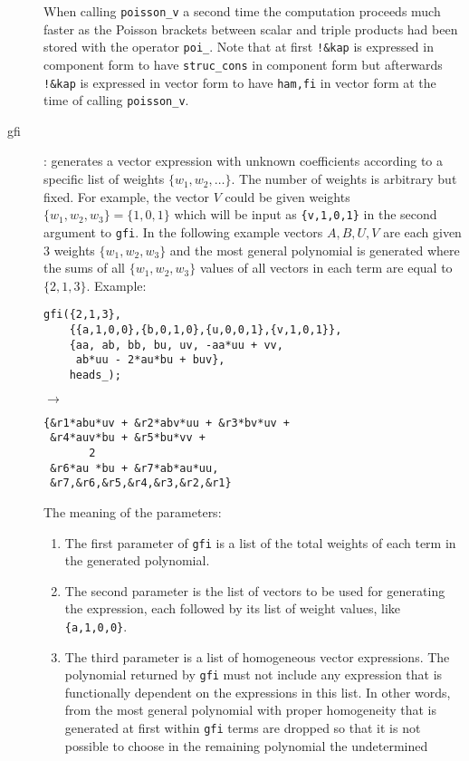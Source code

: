 \begin{description}
  When calling \texttt{poisson\_v} a second time the computation
  proceeds much faster as the Poisson brackets between scalar and
  triple products had been stored with the operator \texttt{poi\_}.
  Note that at first \texttt{!\&kap} is expressed in component form to
  have \texttt{struc\_cons} in component form but afterwards
  \texttt{!\&kap} is expressed in vector form to have \texttt{ham,fi}
  in vector form at the time of calling \texttt{poisson\_v}.

\item[gfi] : generates a vector expression with unknown coefficients
  according to a specific list of weights $\{w_1,w_2,\ldots\}$.  The
  number of weights is arbitrary but fixed.  For example, the vector
  $V$ could be given weights $\{w_1,w_2,w_3\}=\{1,0,1\}$ which will be
  input as \texttt{\{v,1,0,1\}} in the second argument to
  \texttt{gfi}.  In the following example vectors $A,B,U,V$ are each
  given 3 weights $\{w_1,w_2,w_3\}$ and the most general polynomial is
  generated where the sums of all $\{w_1,w_2,w_3\}$ values of all
  vectors in each term are equal to $\{2,1,3\}$.  Example:
\begin{verbatim}
gfi({2,1,3},
    {{a,1,0,0},{b,0,1,0},{u,0,0,1},{v,1,0,1}},
    {aa, ab, bb, bu, uv, -aa*uu + vv,
     ab*uu - 2*au*bu + buv},
    heads_);
\end{verbatim}
$\longrightarrow$
\begin{verbatim}
{&r1*abu*uv + &r2*abv*uu + &r3*bv*uv +
 &r4*auv*bu + &r5*bu*vv +
       2
 &r6*au *bu + &r7*ab*au*uu,
 &r7,&r6,&r5,&r4,&r3,&r2,&r1}
\end{verbatim}
  The meaning of the parameters:
  \begin{enumerate}
  \item The first parameter of \texttt{gfi} is a list of the total
    weights of each term in the generated polynomial.
  \item The second parameter is the list of vectors to be used for
    generating the expression, each followed by its list of weight
    values, like \texttt{\{a,1,0,0\}}.
  \item The third parameter is a list of homogeneous vector
    expressions.  The polynomial returned by \texttt{gfi} must not
    include any expression that is functionally dependent on the
    expressions in this list.  In other words, from the most general
    polynomial with proper homogeneity that is generated at first
    within \texttt{gfi} terms are dropped so that it is not possible
    to choose in the remaining polynomial the undetermined

\end{enumerate}
\end{description}
